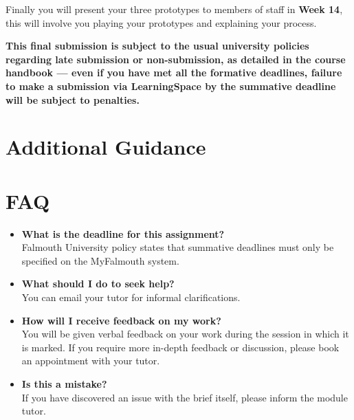 \documentclass{../../fal_assignment}
\begin{document}
Finally you will present your three prototypes to members of staff in \textbf{Week 14}, this will involve you playing your prototypes and explaining your process.

\textbf{This final submission is subject to the usual university policies regarding late submission or non-submission,
as detailed in the course handbook ---
even if you have met all the formative deadlines,
failure to make a submission via LearningSpace by the summative deadline will be subject to penalties.}

\section*{Additional Guidance}



\section*{FAQ}

\begin{itemize}
	\item 	\textbf{What is the deadline for this assignment?} \\ 
    		Falmouth University policy states that summative deadlines must only be specified on the MyFalmouth system.
    		
	\item 	\textbf{What should I do to seek help?} \\ 
    		You can email your tutor for informal clarifications.  
    		
	\item 	\textbf{How will I receive feedback on my work?} \\ 
    		You will be given verbal feedback on your work during the session in which it is marked.
    		If you require more in-depth feedback or discussion, please book an appointment with your tutor.
    		
    	\item 	\textbf{Is this a mistake?} \\ 	
    		If you have discovered an issue with the brief itself, please inform the module tutor.
\end{itemize}
\end{document}
